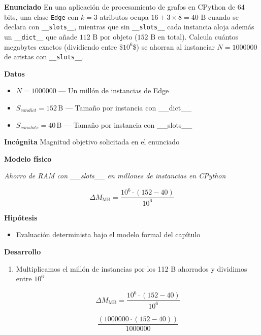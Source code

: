 \documentclass{book}
\begin{document}
\begin{tcolorbox}[title={Problema resuelto}, studiumworked, breakable]

\noindent\textbf{Enunciado}
En una aplicación de procesamiento de grafos en CPython de 64 bits, una clase \texttt{Edge} con \(k = 3\) atributos ocupa \(16 + 3 \times 8 = 40\text{ B}\) cuando se declara con \texttt{\_\_slots\_\_}, mientras que sin \texttt{\_\_slots\_\_} cada instancia aloja además un \texttt{\_\_dict\_\_} que añade \(112\text{ B}\) por objeto (\(152\text{ B}\) en total). Calcula cuántos megabytes exactos (dividiendo entre \$\(10^6\)\$) se ahorran al instanciar \(N = 1000000\) de aristas con \texttt{\_\_slots\_\_}.

\noindent\textbf{Datos}
\begin{itemize}
\item $N = 1000000$ — Un millón de instancias de Edge
\item $S_{con dict} = 152\,\mathrm{B}$ — Tamaño por instancia con \_\_dict\_\_
\item $S_{con slots} = 40\,\mathrm{B}$ — Tamaño por instancia con \_\_slots\_\_
\end{itemize}

\noindent\textbf{Incógnita}
Magnitud objetivo solicitada en el enunciado

\noindent\textbf{Modelo físico}

\noindent\textit{Ahorro de RAM con \_\_slots\_\_ en millones de instancias en CPython}

\[
\Delta M_{\text{MB}} = \frac{10^6 \cdot (152 - 40)}{10^6}
\]

\noindent\textbf{Hipótesis}
\begin{itemize}
\item Evaluación determinista bajo el modelo formal del capítulo
\end{itemize}

\noindent\textbf{Desarrollo}
\begin{enumerate}
\item
Multiplicamos el millón de instancias por los 112 B ahorrados y dividimos entre \(10^6\)

\[
\Delta M_{\text{MB}} = \frac{10^6 \cdot (152 - 40)}{10^6}
\]

\[
\frac{\left(1000000\cdot \left(152-40\right)\right)}{1000000}
\]
\end{enumerate}


\end{tcolorbox}
\end{document}
